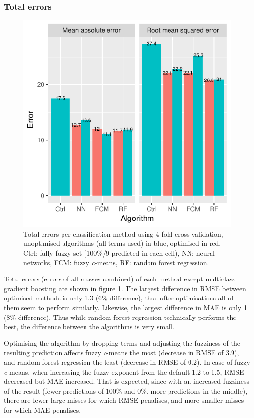\documentclass[a4paper,10pt]{book}
\begin{document}
\subsubsection{Total errors}

\begin{figure}
  \centering
  \includegraphics{../plot/total-errors}
  \caption{Total errors per classification method using 4-fold cross-validation, unoptimised algorithms (all terms used) in blue, optimised in red. Ctrl: fully fuzzy set (100\%/9 predicted in each cell), NN: neural networks, FCM: fuzzy \textit{c}-means, RF: random forest regression.}
  \label{fig-total-errors}
\end{figure}

Total errors (errors of all classes combined) of each method except multiclass gradient boosting are shown in figure \ref{fig-total-errors}. The largest difference in RMSE between optimised methods is only 1.3 (6\% difference), thus after optimisations all of them seem to perform similarly. Likewise, the largest difference in MAE is only 1 (8\% difference). Thus while random forest regression technically performs the best, the difference between the algorithms is very small.

Optimising the algorithm by dropping terms and adjusting the fuzziness of the resulting prediction affects fuzzy \textit{c}-means the most (decrease in RMSE of 3.9), and random forest regression the least (decrease in RMSE of 0.2). In case of fuzzy \textit{c}-means, when increasing the fuzzy exponent from the default 1.2 to 1.5, RMSE decreased but MAE increased. That is expected, since with an increased fuzziness of the result (fewer predictions of 100\% and 0\%, more predictions in the middle), there are fewer large misses for which RMSE penalises, and more smaller misses for which MAE penalises.
\end{document}
